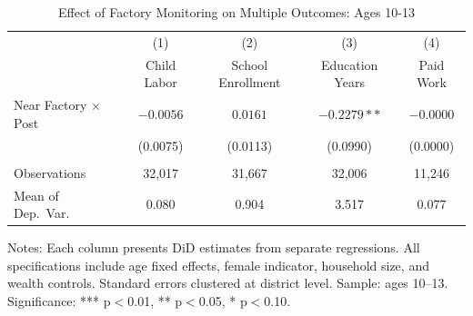 \begin{table}[H]
\centering
\caption{Effect of Factory Monitoring on Multiple Outcomes: Ages 10-13}
\label{tab:multiple_outcomes}
\begin{threeparttable}
\begin{tabular}{lcccc}
\toprule
 & (1) & (2) & (3) & (4) \\
 & Child Labor & School Enrollment & Education Years & Paid Work \\
\midrule
Near Factory $\times$ Post & $-0.0056$ & $0.0161$ & $-0.2279**$ & $-0.0000$ \\
 & (0.0075) & (0.0113) & (0.0990) & (0.0000) \\
\\
\midrule
Observations & 32,017 & 31,667 & 32,006 & 11,246 \\
Mean of Dep.\ Var. & 0.080 & 0.904 & 3.517 & 0.077 \\
\bottomrule
\end{tabular}
\begin{tablenotes}
\footnotesize
\item Notes: Each column presents DiD estimates from separate regressions. All specifications include age fixed effects, female indicator, household size, and wealth controls. Standard errors clustered at district level. Sample: ages 10--13. Significance: *** p$<$0.01, ** p$<$0.05, * p$<$0.10.
\end{tablenotes}
\end{threeparttable}
\end{table}